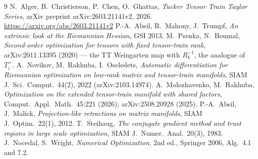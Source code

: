 \documentclass[11pt]{article}
\theoremstyle{definition}
\theoremstyle{plain}
\begin{document}
\begin{small}
\begin{thebibliography}{9}
\setlength{\itemsep}{1pt}
 N.~Alger, B.~Christierson, P.~Chen, O.~Ghattas, \emph{Tucker Tensor Train Taylor Series},
  arXiv preprint arXiv:2603.21141v2, 2026. \url{https://arxiv.org/abs/2603.21141v2}
 P.-A.~Absil, R.~Mahony, J.~Trumpf, \emph{An extrinsic look at the Riemannian Hessian}, GSI 2013.
 M.~Psenka, N.~Boumal, \emph{Second-order optimization for tensors with fixed tensor-train rank},
  arXiv:2011.13395 (2020) --- the TT Weingarten map with $R_k^{-1}$, the analogue of $T_i^{+}$.
 A.~Novikov, M.~Rakhuba, I.~Oseledets, \emph{Automatic differentiation for Riemannian optimization on
  low-rank matrix and tensor-train manifolds}, SIAM J.\ Sci.\ Comput.\ 44(2), 2022 (arXiv:2103.14974).
 A.~Molozhavenko, M.~Rakhuba, \emph{Optimization on the extended tensor-train manifold with shared
  factors}, Comput.\ Appl.\ Math.\ 45:221 (2026); arXiv:2508.20928 (2025).
 P.-A.~Absil, J.~Malick, \emph{Projection-like retractions on matrix manifolds}, SIAM J.\ Optim.\
  22(1), 2012.
 T.~Steihaug, \emph{The conjugate gradient method and trust regions in large scale optimization},
  SIAM J.\ Numer.\ Anal.\ 20(3), 1983.
 J.~Nocedal, S.~Wright, \emph{Numerical Optimization}, 2nd ed., Springer 2006, Alg.~4.1 and 7.2.
\end{thebibliography}
\end{small}
\end{document}
